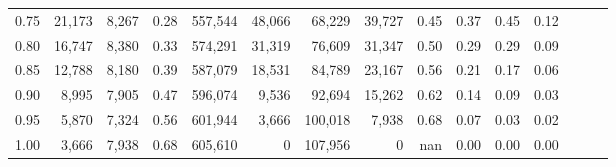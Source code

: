 \begin{tabular}{rrrrrrrrrrrrrrr}
0.75 &  21,173 &  8,267 &  0.28 &  557,544 &   48,066 &   68,229 &   39,727 &  0.45 &  0.37 &  0.45 &      0.12 \\
0.80 &  16,747 &  8,380 &  0.33 &  574,291 &   31,319 &   76,609 &   31,347 &  0.50 &  0.29 &  0.29 &      0.09 \\
0.85 &  12,788 &  8,180 &  0.39 &  587,079 &   18,531 &   84,789 &   23,167 &  0.56 &  0.21 &  0.17 &      0.06 \\
0.90 &   8,995 &  7,905 &  0.47 &  596,074 &    9,536 &   92,694 &   15,262 &  0.62 &  0.14 &  0.09 &      0.03 \\
0.95 &   5,870 &  7,324 &  0.56 &  601,944 &    3,666 &  100,018 &    7,938 &  0.68 &  0.07 &  0.03 &      0.02 \\
1.00 &   3,666 &  7,938 &  0.68 &  605,610 &        0 &  107,956 &        0 &   nan &  0.00 &  0.00 &      0.00 \\
\bottomrule
\end{tabular}
